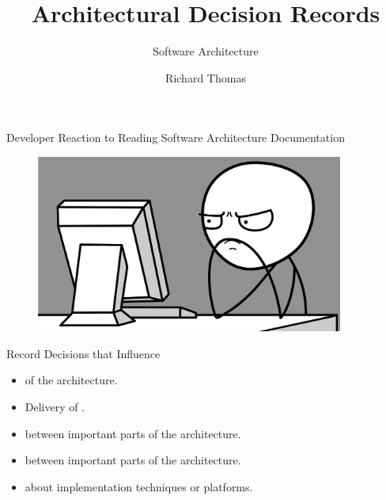 \documentclass{slide}
\title{Architectural Decision Records}
\subtitle{Software Architecture}
\author{Richard Thomas}
\date{\week{2}}
\begin{document}
\maketitle


\begin{frame}{Developer Reaction to Reading Software Architecture Documentation}

\begin{figure}
    \href{https://pixabay.com/vectors/computer-internet-unhappy-user-1295358/}{\includegraphics[width=0.9\textwidth]{images/frustration.png}}
\end{figure}

\end{frame}


{}


\begin{frame}{Record Decisions that Influence}

\Large{
\begin{itemize}
    \item {} of the architecture.
    \item Delivery of .
    \item {} between important parts of the architecture.
    \item {} between important parts of the architecture.
    \item {} about implementation techniques or platforms.
\end{itemize}
}

\end{frame}
\end{document}
